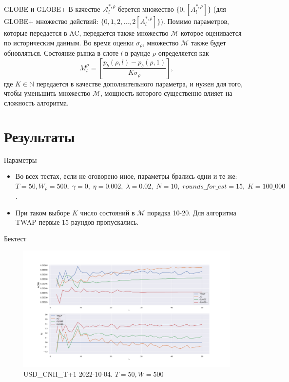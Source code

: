 \documentclass[aspectratio=169]{beamer}
\begin{document}
        \begin{frame}{GLOBE и GLOBE+}
            В качестве $\mathcal A_l^{*, \rho}$ берется множество $\{0, [A_l^{*,\rho}]\}$ (для GLOBE+ множество действий: $\{0, 1, 2, \ldots, 2 [A_l^{*,\rho}] \} )$. Помимо параметров, которые передается в AC, передается также множество $\mathcal M$ которое оценивается по историческим данным. Во время оценки $\sigma_\rho$, множество $\mathcal M$ также будет обновляться. 
            Состояние рынка в слоте $l$ в раунде $\rho$ определяется как 
            \begin{equation*}
                M_l^\rho = \left[\frac {p_b(\rho, l) - p_b(\rho, 1)}{K\sigma_\rho} \right],
            \end{equation*}
            где $K \in \mathbb N$ передается в качестве дополнительного параметра, и нужен для того, чтобы уменьшить множество $\mathcal M$, мощность которого существенно влияет на сложность алгоритма.

        \end{frame}


    \section{Результаты}

        \begin{frame}{Параметры}
            \begin{itemize}
                \item Во всех тестах, если не оговорено иное, параметры брались одни и те же: $T = 50, W_\rho = 500, \; \gamma = 0, \; \eta = 0.002, \; \lambda = 0.02, \; N = 10, \; rounds\_for\_est = 15, \; K = 100\_000$. 

                \item При таком выборе $K$ число состояний в $\mathcal M$ порядка 10-20. Для алгоритма TWAP первые 15 раундов пропускались. 
            \end{itemize}  
        \end{frame}
        
        \begin{frame}{Бектест}
        
            \begin{figure}  
                \centering
                \includegraphics[width=0.83\linewidth]{USD_CNH_T+1 2022-10-04 T = 50 W = 500}
                \caption{USD\_CNH\_T+1 2022-10-04. $T = 50, W = 500$}
            \end{figure}

        \end{frame}
\end{document}
